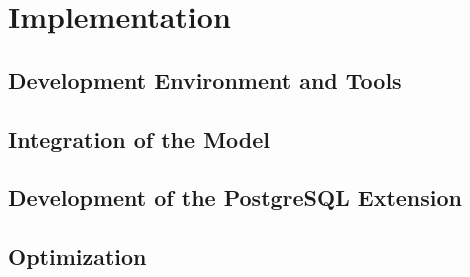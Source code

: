 \section{Implementation}



\subsection{Development Environment and Tools}

\subsection{Integration of the Model}


\subsection{Development of the PostgreSQL Extension}


\subsection{Optimization}

\newpage

